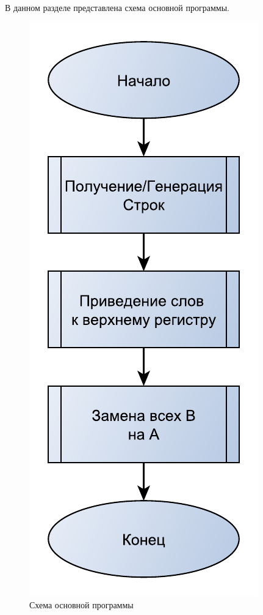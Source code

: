 \documentclass[../main.tex]{subfiles}
\begin{document}
	
	В данном разделе представлена схема основной программы.
	
	\begin{figure}[H]
		\centering
		\includegraphics[width=0.7\linewidth]{src/img/1}
		\caption{Схема основной программы}
		\label{fig:1}
	\end{figure}
	
\end{document}
